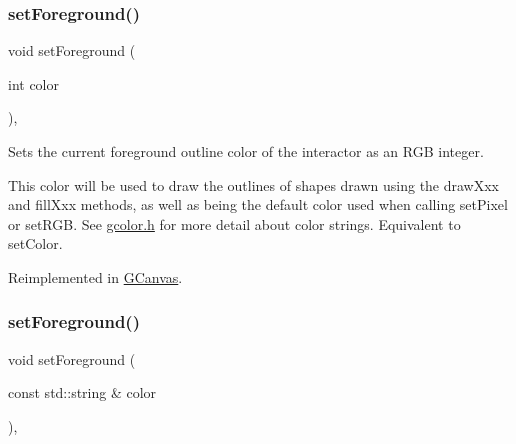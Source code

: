 \mbox{\label{classsgl_1_1GDrawingSurface_a7daa57084b5811b598fce8726660b328}} 
\subsubsection{\texorpdfstring{set\+Foreground()}{setForeground()}\hspace{0.1cm}{\footnotesize\ttfamily [1/2]}}
{\footnotesize\ttfamily void set\+Foreground (\begin{DoxyParamCaption}\item[{int}]{color }\end{DoxyParamCaption})\hspace{0.3cm}{\ttfamily [virtual]}, {\ttfamily [inherited]}}



Sets the current foreground outline color of the interactor as an R\+GB integer. 

This color will be used to draw the outlines of shapes drawn using the draw\+Xxx and fill\+Xxx methods, as well as being the default color used when calling set\+Pixel or set\+R\+GB. See \mbox{\hyperlink{gcolor_8h_source}{gcolor.\+h}} for more detail about color strings. Equivalent to set\+Color. 

Reimplemented in \mbox{\hyperlink{classsgl_1_1GCanvas_a59f7cd2bd1708c12dfa52a8f7c7b79c9}{G\+Canvas}}.

\mbox{\label{classsgl_1_1GDrawingSurface_af59209aeadea6dfc6d97a2d8531f50e1}} 
\subsubsection{\texorpdfstring{set\+Foreground()}{setForeground()}\hspace{0.1cm}{\footnotesize\ttfamily [2/2]}}
{\footnotesize\ttfamily void set\+Foreground (\begin{DoxyParamCaption}\item[{const std\+::string \&}]{color }\end{DoxyParamCaption})\hspace{0.3cm}{\ttfamily [virtual]}, {\ttfamily [inherited]}}



